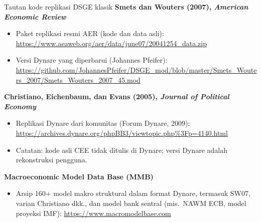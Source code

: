 \documentclass[aspectratio=169,11pt]{beamer}
\begin{document}
\begin{frame}{Tautan kode replikasi DSGE klasik}
\scriptsize
\setlength{\itemsep}{0pt}
\textbf{Smets dan Wouters (2007), \emph{American Economic Review}}
\begin{itemize}
  \item Paket replikasi resmi AER (kode dan data asli):
        \\ \url{https://www.aeaweb.org/aer/data/june07/20041254_data.zip}
  \item Versi Dynare yang diperbarui (Johannes Pfeifer):
        \\ \url{https://github.com/JohannesPfeifer/DSGE_mod/blob/master/Smets_Wouters_2007/Smets_Wouters_2007_45.mod}
\end{itemize}
\textbf{Christiano, Eichenbaum, dan Evans (2005), \emph{Journal of Political Economy}}
\begin{itemize}
  \item Replikasi Dynare dari komunitas (Forum Dynare, 2009):
        \\ \url{https://archives.dynare.org/phpBB3/viewtopic.php\%3Fp=4140.html}
  \item Catatan: kode asli CEE tidak ditulis di Dynare; versi Dynare
        adalah rekonstruksi pengguna.
\end{itemize}
\textbf{Macroeconomic Model Data Base (MMB)}
\begin{itemize}
  \item Arsip 160+ model makro struktural dalam format Dynare, termasuk
        SW07, varian Christiano dkk., dan model bank sentral (mis.\ NAWM
        ECB, model proyeksi IMF): \url{https://www.macromodelbase.com}
\end{itemize}
\end{frame}
\end{document}
